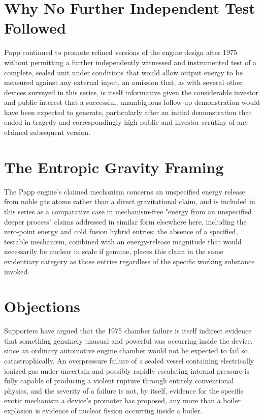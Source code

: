 \documentclass[11pt]{article}
\begin{document}
\section{Why No Further Independent Test Followed}

Papp continued to promote refined versions of the engine design after 1975 without permitting a further independently witnessed and instrumented test of a complete, sealed unit under conditions that would allow output energy to be measured against any external input, an omission that, as with several other devices surveyed in this series, is itself informative given the considerable investor and public interest that a successful, unambiguous follow-up demonstration would have been expected to generate, particularly after an initial demonstration that ended in tragedy and correspondingly high public and investor scrutiny of any claimed subsequent version.

\section{The Entropic Gravity Framing}

The Papp engine's claimed mechanism concerns an unspecified energy release from noble gas atoms rather than a direct gravitational claim, and is included in this series as a comparative case in mechanism-free "energy from an unspecified deeper process" claims addressed in similar form elsewhere here, including the zero-point energy and cold fusion hybrid entries; the absence of a specified, testable mechanism, combined with an energy-release magnitude that would necessarily be nuclear in scale if genuine, places this claim in the same evidentiary category as those entries regardless of the specific working substance invoked.

\section{Objections}

Supporters have argued that the 1975 chamber failure is itself indirect evidence that something genuinely unusual and powerful was occurring inside the device, since an ordinary automotive engine chamber would not be expected to fail so catastrophically. An overpressure failure of a sealed vessel containing electrically ionized gas under uncertain and possibly rapidly escalating internal pressure is fully capable of producing a violent rupture through entirely conventional physics, and the severity of a failure is not, by itself, evidence for the specific exotic mechanism a device's promoter has proposed, any more than a boiler explosion is evidence of nuclear fission occurring inside a boiler.
\end{document}
